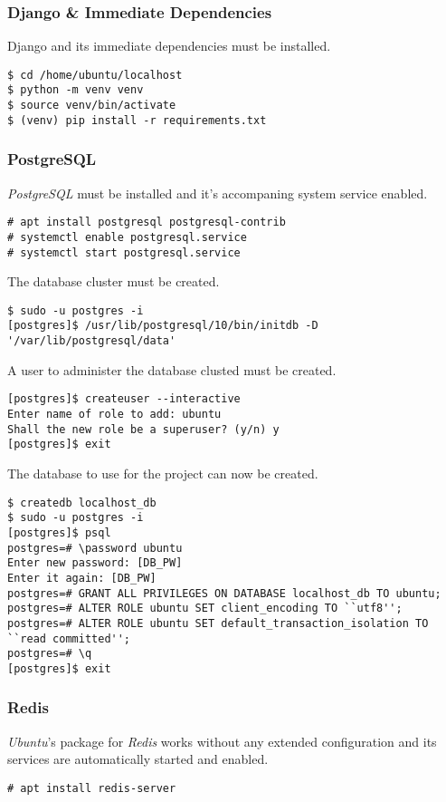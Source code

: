 \subsubsection{Django \& Immediate Dependencies}

Django and its immediate dependencies must be installed.
\begin{lstlisting}
$ cd /home/ubuntu/localhost
$ python -m venv venv
$ source venv/bin/activate
$ (venv) pip install -r requirements.txt
\end{lstlisting}

\subsubsection{PostgreSQL}

\emph{PostgreSQL} must be installed and it's accompaning system service enabled.
\begin{lstlisting}
# apt install postgresql postgresql-contrib
# systemctl enable postgresql.service
# systemctl start postgresql.service
\end{lstlisting}
The database cluster must be created.
\begin{lstlisting}
$ sudo -u postgres -i
[postgres]$ /usr/lib/postgresql/10/bin/initdb -D '/var/lib/postgresql/data'
\end{lstlisting}
A user to administer the database clusted must be created.
\begin{lstlisting}
[postgres]$ createuser --interactive
Enter name of role to add: ubuntu
Shall the new role be a superuser? (y/n) y
[postgres]$ exit
\end{lstlisting}
The database to use for the project can now be created.
\begin{lstlisting}
$ createdb localhost_db
$ sudo -u postgres -i
[postgres]$ psql
postgres=# \password ubuntu
Enter new password: [DB_PW]
Enter it again: [DB_PW]
postgres=# GRANT ALL PRIVILEGES ON DATABASE localhost_db TO ubuntu;
postgres=# ALTER ROLE ubuntu SET client_encoding TO ``utf8'';
postgres=# ALTER ROLE ubuntu SET default_transaction_isolation TO ``read committed'';
postgres=# \q
[postgres]$ exit
\end{lstlisting}

\subsubsection{Redis}

\emph{Ubuntu}'s package for \emph{Redis} works without any extended configuration and its services are automatically started and enabled.
\begin{lstlisting}
# apt install redis-server
\end{lstlisting}

